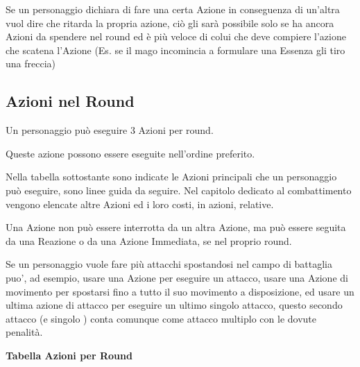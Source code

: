 \documentclass[a4paper,11pt,twoside,openany]{book}
\begin{document}
Se un personaggio dichiara di fare una certa Azione in conseguenza di un'altra vuol dire che ritarda la propria azione, ciò gli sarà possibile solo se ha ancora Azioni da spendere nel round ed è più veloce di colui che deve compiere l'azione che scatena l'Azione (Es. se il mago incomincia a formulare una Essenza gli tiro una freccia)

\subsection{Azioni nel Round}

\label{azioni-nel-round}

Un personaggio può eseguire 3 Azioni per round.

Queste azione possono essere eseguite nell'ordine preferito.

Nella tabella sottostante sono indicate le Azioni principali che un personaggio può eseguire, sono linee guida da seguire. Nel capitolo dedicato al combattimento vengono elencate altre Azioni ed i loro costi, in azioni, relative.

Una Azione non può essere interrotta da un altra Azione, ma può essere seguita da una Reazione o da una Azione Immediata, se nel proprio round.

Se un personaggio vuole fare più attacchi spostandosi nel campo di battaglia puo', ad esempio, usare una Azione per eseguire un attacco, usare una Azione di movimento per spostarsi fino a tutto il suo movimento a disposizione, ed usare un ultima azione di attacco per eseguire un ultimo singolo attacco, questo secondo attacco (e singolo ) conta comunque come attacco multiplo con le dovute penalità.

\medskip

\textbf{Tabella Azioni per Round}

\medskip
\end{document}
